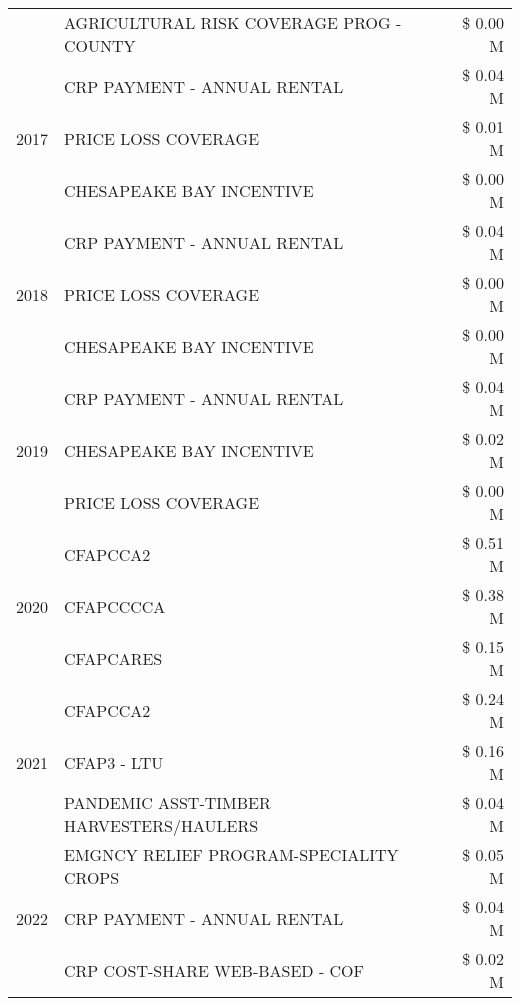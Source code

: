 \begin{tabular}{llr}
 & AGRICULTURAL RISK COVERAGE PROG - COUNTY & \$ 0.00 M \\
\cline{1-3}
\multirow[t]{3}{*}{2017} & CRP PAYMENT - ANNUAL RENTAL & \$ 0.04 M \\
 & PRICE LOSS COVERAGE & \$ 0.01 M \\
 & CHESAPEAKE BAY INCENTIVE & \$ 0.00 M \\
\cline{1-3}
\multirow[t]{3}{*}{2018} & CRP PAYMENT - ANNUAL RENTAL & \$ 0.04 M \\
 & PRICE LOSS COVERAGE & \$ 0.00 M \\
 & CHESAPEAKE BAY INCENTIVE & \$ 0.00 M \\
\cline{1-3}
\multirow[t]{3}{*}{2019} & CRP PAYMENT - ANNUAL RENTAL & \$ 0.04 M \\
 & CHESAPEAKE BAY INCENTIVE & \$ 0.02 M \\
 & PRICE LOSS COVERAGE & \$ 0.00 M \\
\cline{1-3}
\multirow[t]{3}{*}{2020} & CFAPCCA2 & \$ 0.51 M \\
 & CFAPCCCCA & \$ 0.38 M \\
 & CFAPCARES & \$ 0.15 M \\
\cline{1-3}
\multirow[t]{3}{*}{2021} & CFAPCCA2 & \$ 0.24 M \\
 & CFAP3 - LTU & \$ 0.16 M \\
 & PANDEMIC ASST-TIMBER HARVESTERS/HAULERS & \$ 0.04 M \\
\cline{1-3}
\multirow[t]{3}{*}{2022} & EMGNCY RELIEF PROGRAM-SPECIALITY CROPS & \$ 0.05 M \\
 & CRP PAYMENT - ANNUAL RENTAL & \$ 0.04 M \\
 & CRP COST-SHARE WEB-BASED - COF & \$ 0.02 M \\
\cline{1-3}
\bottomrule
\end{tabular}
